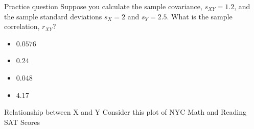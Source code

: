 \documentclass[aspectratio=169,t,11pt,table]{beamer}
\begin{document}
\begin{frame}{Practice question}
  Suppose you calculate the sample covariance, $s_{XY} = 1.2$, and the sample standard deviations $s_X = 2$ and $s_Y = 2.5$. What is the sample correlation, $r_{XY}$?

  \begin{itemize}
    \item $0.0576$
    \item $0.24$
    \item $0.048$
    \item $4.17$
  \end{itemize}
\end{frame}


\begin{frame}{Relationship between X and Y}
  Consider this plot of NYC Math and Reading SAT Scores
  
  \medskip
  \begin{center}
  \end{center}
\end{frame}
\end{document}
